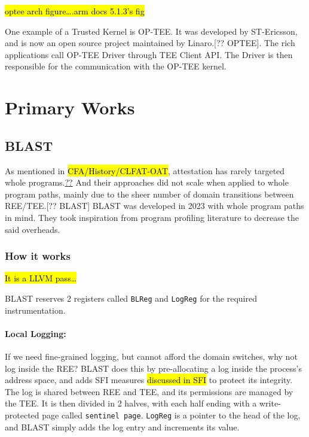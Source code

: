 \documentclass[a4paper, nobind]{templates/ociamthesis}
\begin{document}
\hl{optee arch figure\ldots.arm docs 5.1.3's fig}

One example of a Trusted Kernel is OP-TEE. It was developed by ST-Ericsson,
and is now an open source project maintained by Linaro.{[}?? OPTEE{]}.
The rich applications call OP-TEE Driver through TEE Client API. The Driver
is then responsible for the communication with the OP-TEE kernel.

\section{Primary Works}\label{primary-works}

\subsection{BLAST}\label{blast}

As mentioned in \hl{CFA/History/CLFAT-OAT}, attestation has rarely targeted whole programs.\href{}{??}
And their approaches did not scale when applied to whole program paths, mainly
due to the sheer number of domain transitions between REE/TEE.{[}?? BLAST{]}
BLAST was developed in 2023 with whole program paths in mind.
They took inspiration from program profiling literature to decrease the said overheads.

\subsubsection{How it works}\label{how-it-works}

\hl{It is a LLVM pass\ldots{}}

BLAST reserves 2 registers called \texttt{BLReg} and \texttt{LogReg} for the required instrumentation.

\paragraph{Local Logging:}\label{local-logging}

If we need fine-grained logging, but cannot afford the domain switches, why not log inside the REE?
BLAST does this by pre-allocating a log inside the process's address space,
and adds SFI measures \hl{discussed in SFI} to protect its integrity.
The log is shared between REE and TEE, and its permissions are managed by the TEE.
It is then divided in 2 halves, with each half ending with a write-protected page called \texttt{sentinel\ page}.
\texttt{LogReg} is a pointer to the head of the log, and BLAST simply adds the log entry
and increments its value.
\end{document}
